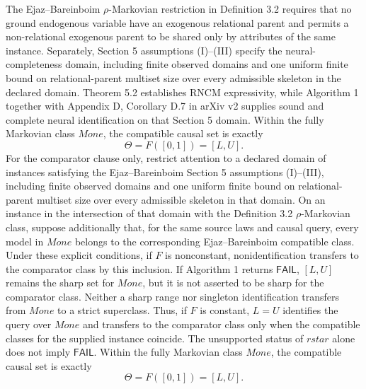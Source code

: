 The Ejaz--Bareinboim \(\rho\)-Markovian restriction in Definition 3.2 requires that no ground endogenous variable have an exogenous relational parent and permits a non-relational exogenous parent to be shared only by attributes of the same instance.  Separately, Section 5 assumptions (I)--(III) specify the neural-completeness domain, including finite observed domains and one uniform finite bound on relational-parent multiset size over every admissible skeleton in the declared domain.  Theorem 5.2 establishes RNCM expressivity, while Algorithm 1 together with Appendix D, Corollary D.7 in arXiv v2 supplies sound and complete neural identification on that Section 5 domain.
Within the fully Markovian class \(Mone\), the compatible causal set is exactly
\[
 \Theta=F([0,1])=[L,U].
\]
For the comparator clause only, restrict attention to a declared domain of instances satisfying the Ejaz--Bareinboim Section 5 assumptions (I)--(III), including finite observed domains and one uniform finite bound on relational-parent multiset size over every admissible skeleton in that domain.  On an instance in the intersection of that domain with the Definition 3.2 \(\rho\)-Markovian class, suppose additionally that, for the same source laws and causal query, every model in \(Mone\) belongs to the corresponding Ejaz--Bareinboim compatible class.  Under these explicit conditions, if \(F\) is nonconstant, nonidentification transfers to the comparator class by this inclusion.  If Algorithm 1 returns \(\mathsf{FAIL}\), \([L,U]\) remains the sharp set for \(Mone\), but it is not asserted to be sharp for the comparator class.  Neither a sharp range nor singleton identification transfers from \(Mone\) to a strict superclass.  Thus, if \(F\) is constant, \(L=U\) identifies the query over \(Mone\) and transfers to the comparator class only when the compatible classes for the supplied instance coincide.  The unsupported status of \(rstar\) alone does not imply \(\mathsf{FAIL}\).
Within the fully Markovian class \(Mone\), the compatible causal set is exactly
\[
 \Theta=F([0,1])=[L,U].
\]
